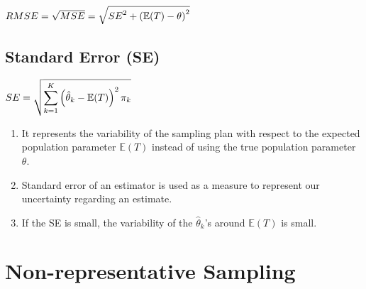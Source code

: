 \hfill
$
    RMSE 
    = \sqrt{MSE} 
    = \sqrt{{SE}^2 + \left(\mathbb{E}(T) - \theta\right)^2}
$
\hfill \cite{statistics/book/Statistics-for-Data-Scientists/Maurits-Kaptein}






\subsection{Standard Error (SE)}\label{Sampling Plans/Measures of closeness/Standard Error (SE)}


\hfill
$
    SE = \sqrt{
        \displaystyle\sum_{k=1}^{K} \left(
            \hat{\theta}_k - \mathbb{E}(T)
        \right)^2
        \pi_k
    }
$
\hfill \cite{statistics/book/Statistics-for-Data-Scientists/Maurits-Kaptein}


\begin{enumerate}[itemsep=0.2cm]
    \item It represents the variability of the sampling plan with respect to the expected population parameter $\mathbb{E}(T)$ instead of using the true population parameter $\theta$.
    \hfill \cite{statistics/book/Statistics-for-Data-Scientists/Maurits-Kaptein}

    \item Standard error of an estimator is used as a measure to represent our uncertainty regarding an estimate.
    \hfill \cite{statistics/book/Statistics-for-Data-Scientists/Maurits-Kaptein}

    \item If the SE is small, the variability of the $\hat{\theta}_k$’s around $\mathbb{E}(T)$ is small. 
    \hfill \cite{statistics/book/Statistics-for-Data-Scientists/Maurits-Kaptein}
\end{enumerate}










\section{Non-representative Sampling \cite{statistics/book/Statistics-for-Data-Scientists/Maurits-Kaptein}}\label{Sampling Plans/Non-representative Sampling}

